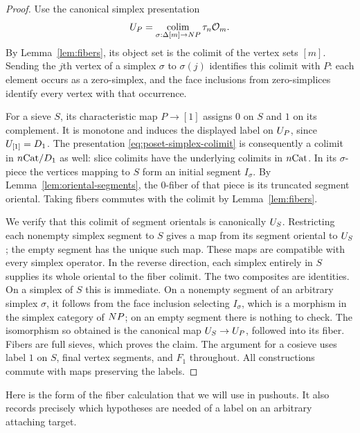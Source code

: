 \begin{proof}
Use the canonical simplex presentation
\begin{equation}\label{eq:poset-simplex-colimit}
 U_{P}=\operatorname*{colim}_{\sigma:\Delta[m]\to N P}\tau_n\mathcal O_{m}.
\end{equation}
By Lemma~\ref{lem:fibers}, its object set is the colimit of the vertex
sets $[m]$.  Sending the $j$th vertex of a simplex $\sigma$ to
$\sigma(j)$ identifies this colimit with $P$: each element occurs as
a zero-simplex, and the face inclusions from zero-simplices identify
every vertex with that occurrence.

For a sieve $S$, its characteristic map $P\to[1]$ assigns $0$ on $S$
and $1$ on its complement.  It is monotone and induces the displayed
label on $U_{P}$, since $U_{[1]}=D_{1}$.  The presentation
\eqref{eq:poset-simplex-colimit} is consequently a colimit in
$n\mathrm{Cat}/D_{1}$ as well: slice colimits have the underlying colimits
in $n\mathrm{Cat}$.  In its $\sigma$-piece the vertices mapping to $S$ form an
initial segment $I_\sigma$.  By Lemma~\ref{lem:oriental-segments},
the $0$-fiber of that piece is its truncated segment oriental.
Taking fibers commutes with the colimit by Lemma~\ref{lem:fibers}.

We verify that this colimit of segment orientals is canonically
$U_{S}$.  Restricting each nonempty simplex segment to $S$ gives a
map from its segment oriental to $U_{S}$; the empty segment has the
unique such map.  These maps are compatible with every simplex
operator.  In the reverse direction, each simplex entirely in $S$
supplies its whole oriental to the fiber colimit.  The two composites
are identities.  On a simplex of $S$ this is immediate.  On a
nonempty segment of an arbitrary simplex $\sigma$, it follows from
the face inclusion selecting $I_\sigma$, which is a morphism in the
simplex category of $N P$; on an empty segment there is nothing
to check.  The isomorphism so obtained is the canonical map
$U_{S}\to U_{P}$, followed into its fiber.  Fibers are full sieves,
which proves the claim.  The argument for a cosieve uses label $1$
on $S$, final vertex segments, and $F_1$ throughout.  All constructions
commute with maps preserving the labels.
\end{proof}

Here is the form of the fiber calculation that we will use in pushouts.
It also records precisely which hypotheses are needed of a label on an
arbitrary attaching target.

